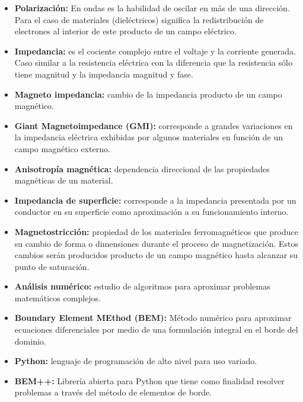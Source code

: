 \documentclass[12pt,letterpaper]{article}
\numberwithin{equation}{section}
\begin{document}
\begin{itemize}
	\item \textbf{Polarización:} En ondas es la habilidad de oscilar en más de una dirección. Para el caso de materiales (dieléctricos) significa la redistribución de electrones al interior de este producto de un campo eléctrico.
	\item \textbf{Impedancia:} es el cociente complejo entre el voltaje y la corriente generada. Caso similar a la resistencia eléctrica con la diferencia que la resistencia sólo tiene magnitud y la impedancia magnitud y fase.
	\item \textbf{Magneto impedancia:} cambio de la impedancia producto de un campo magnético.
	\item \textbf{Giant Magnetoimpedance (GMI):} corresponde a grandes variaciones en la impedancia eléctrica exhibidas por algunos materiales en función de un campo magnético externo.
	\item \textbf{Anisotropía magnética:} dependencia direccional de las propiedades magnéticas de un material.
	\item \textbf{Impedancia de superficie:} corresponde a la impedancia presentada por un conductor en su superficie como aproximación a su funcionamiento interno. 
	\item \textbf{Magnetostricción:} propiedad de los materiales ferromagnéticos que produce su cambio de forma o dimensiones durante el proceso de magnetización. Estos cambios serán producidos producto de un campo magnético hasta alcanzar su punto de saturación.
	\item \textbf{Análisis numérico:} estudio de algoritmos para aproximar problemas matemáticos complejos.
	\item \textbf{Boundary Element MEthod (BEM):} Método numérico para aproximar ecuaciones diferenciales por medio de una formulación integral en el borde del dominio.
	\item \textbf{Python:} lenguaje de programación de alto nivel para uso variado.
	\item \textbf{BEM++:} Librería abierta para Python que tiene como finalidad resolver problemas a través del método de elementos de borde.
	
\end{itemize}
\pagebreak
\tableofcontents

\pagebreak
{}
\end{document}
